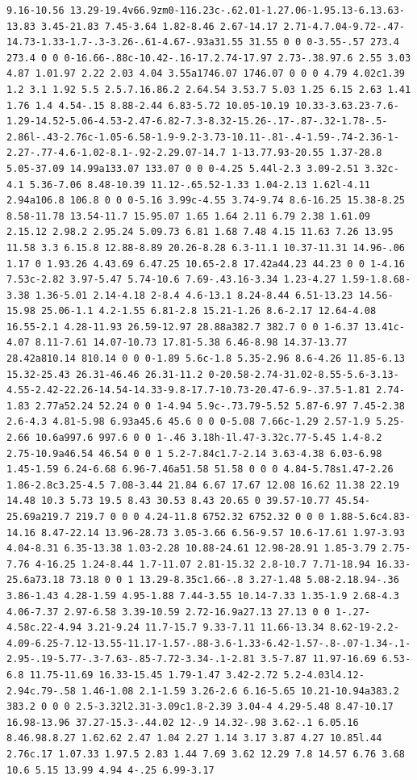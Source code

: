 \documentclass[11pt]{article}
\begin{document}
\begin{enumerate}
\begin{verbatim}
9.16-10.56 13.29-19.4v66.9zm0-116.23c-.62.01-1.27.06-1.95.13-6.13.63-13.83 3.45-21.83 7.45-3.64 1.82-8.46 2.67-14.17 2.71-4.7.04-9.72-.47-14.73-1.33-1.7-.3-3.26-.61-4.67-.93a31.55 31.55 0 0 0-3.55-.57 273.4 273.4 0 0 0-16.66-.88c-10.42-.16-17.2.74-17.97 2.73-.38.97.6 2.55 3.03 4.87 1.01.97 2.22 2.03 4.04 3.55a1746.07 1746.07 0 0 0 4.79 4.02c1.39 1.2 3.1 1.92 5.5 2.5.7.16.86.2 2.64.54 3.53.7 5.03 1.25 6.15 2.63 1.41 1.76 1.4 4.54-.15 8.88-2.44 6.83-5.72 10.05-10.19 10.33-3.63.23-7.6-1.29-14.52-5.06-4.53-2.47-6.82-7.3-8.32-15.26-.17-.87-.32-1.78-.5-2.86l-.43-2.76c-1.05-6.58-1.9-9.2-3.73-10.11-.81-.4-1.59-.74-2.36-1-2.27-.77-4.6-1.02-8.1-.92-2.29.07-14.7 1-13.77.93-20.55 1.37-28.8 5.05-37.09 14.99a133.07 133.07 0 0 0-4.25 5.44l-2.3 3.09-2.51 3.32c-4.1 5.36-7.06 8.48-10.39 11.12-.65.52-1.33 1.04-2.13 1.62l-4.11 2.94a106.8 106.8 0 0 0-5.16 3.99c-4.55 3.74-9.74 8.6-16.25 15.38-8.25 8.58-11.78 13.54-11.7 15.95.07 1.65 1.64 2.11 6.79 2.38 1.61.09 2.15.12 2.98.2 2.95.24 5.09.73 6.81 1.68 7.48 4.15 11.63 7.26 13.95 11.58 3.3 6.15.8 12.88-8.89 20.26-8.28 6.3-11.1 10.37-11.31 14.96-.06 1.17 0 1.93.26 4.43.69 6.47.25 10.65-2.8 17.42a44.23 44.23 0 0 1-4.16 7.53c-2.82 3.97-5.47 5.74-10.6 7.69-.43.16-3.34 1.23-4.27 1.59-1.8.68-3.38 1.36-5.01 2.14-4.18 2-8.4 4.6-13.1 8.24-8.44 6.51-13.23 14.56-15.98 25.06-1.1 4.2-1.55 6.81-2.8 15.21-1.26 8.6-2.17 12.64-4.08 16.55-2.1 4.28-11.93 26.59-12.97 28.88a382.7 382.7 0 0 1-6.37 13.41c-4.07 8.11-7.61 14.07-10.73 17.81-5.38 6.46-8.98 14.37-13.77 28.42a810.14 810.14 0 0 0-1.89 5.6c-1.8 5.35-2.96 8.6-4.26 11.85-6.13 15.32-25.43 26.31-46.46 26.31-11.2 0-20.58-2.74-31.02-8.55-5.6-3.13-4.55-2.42-22.26-14.54-14.33-9.8-17.7-10.73-20.47-6.9-.37.5-1.81 2.74-1.83 2.77a52.24 52.24 0 0 1-4.94 5.9c-.73.79-5.52 5.87-6.97 7.45-2.38 2.6-4.3 4.81-5.98 6.93a45.6 45.6 0 0 0-5.08 7.66c-1.29 2.57-1.9 5.25-2.66 10.6a997.6 997.6 0 0 1-.46 3.18h-1l.47-3.32c.77-5.45 1.4-8.2 2.75-10.9a46.54 46.54 0 0 1 5.2-7.84c1.7-2.14 3.63-4.38 6.03-6.98 1.45-1.59 6.24-6.68 6.96-7.46a51.58 51.58 0 0 0 4.84-5.78s1.47-2.26 1.86-2.8c3.25-4.5 7.08-3.44 21.84 6.67 17.67 12.08 16.62 11.38 22.19 14.48 10.3 5.73 19.5 8.43 30.53 8.43 20.65 0 39.57-10.77 45.54-25.69a219.7 219.7 0 0 0 4.24-11.8 6752.32 6752.32 0 0 0 1.88-5.6c4.83-14.16 8.47-22.14 13.96-28.73 3.05-3.66 6.56-9.57 10.6-17.61 1.97-3.93 4.04-8.31 6.35-13.38 1.03-2.28 10.88-24.61 12.98-28.91 1.85-3.79 2.75-7.76 4-16.25 1.24-8.44 1.7-11.07 2.81-15.32 2.8-10.7 7.71-18.94 16.33-25.6a73.18 73.18 0 0 1 13.29-8.35c1.66-.8 3.27-1.48 5.08-2.18.94-.36 3.86-1.43 4.28-1.59 4.95-1.88 7.44-3.55 10.14-7.33 1.35-1.9 2.68-4.3 4.06-7.37 2.97-6.58 3.39-10.59 2.72-16.9a27.13 27.13 0 0 1-.27-4.58c.22-4.94 3.21-9.24 11.7-15.7 9.33-7.11 11.66-13.34 8.62-19-2.2-4.09-6.25-7.12-13.55-11.17-1.57-.88-3.6-1.33-6.42-1.57-.8-.07-1.34-.1-2.95-.19-5.77-.3-7.63-.85-7.72-3.34-.1-2.81 3.5-7.87 11.97-16.69 6.53-6.8 11.75-11.69 16.33-15.45 1.79-1.47 3.42-2.72 5.2-4.03l4.12-2.94c.79-.58 1.46-1.08 2.1-1.59 3.26-2.6 6.16-5.65 10.21-10.94a383.2 383.2 0 0 0 2.5-3.32l2.31-3.09c1.8-2.39 3.04-4 4.29-5.48 8.47-10.17 16.98-13.96 37.27-15.3-.44.02 12-.9 14.32-.98 3.62-.1 6.05.16 8.46.98.8.27 1.62.62 2.47 1.04 2.27 1.14 3.17 3.87 4.27 10.85l.44 2.76c.17 1.07.33 1.97.5 2.83 1.44 7.69 3.62 12.29 7.8 14.57 6.76 3.68 10.6 5.15 13.99 4.94 4-.25 6.99-3.17 
\end{verbatim}
\end{enumerate}
\end{document}
